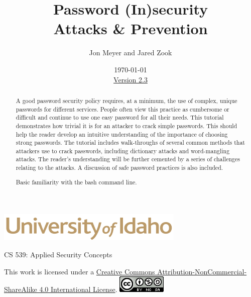 \documentclass[12pt]{extarticle}
\begin{document}
\title{ Password (In)security \\ \large Attacks \& Prevention}
\author{Jon Meyer and Jared Zook}
\date{\today \\ \hyperref[changelog]{Version 2.3} }
\renewcommand{\abstractname}{Summary}
\begin{titlepage}
\maketitle
{}
\begin{center}
\includegraphics[scale=.5]{UofI}

\large{CS 539: Applied Security Concepts}

\vskip 40pt

\end{center}

\begin{abstract}
A good password security policy requires, at a minimum, the use of complex, unique passwords for different services. People often view this practice as cumbersome or difficult and continue to use one easy password for all their needs. This tutorial demonstrates how trivial it is for an attacker to crack simple passwords. This should help the reader develop an intuitive understanding of the importance of choosing strong passwords. The tutorial includes walk-throughs of several common methods that attackers use to crack passwords, including dictionary attacks and word-mangling attacks. The reader's understanding will be further cemented by a series of challenges relating to the attacks. A discussion of safe password practices is also included.


Basic familiarity with the bash command line.
\end{abstract}


\vfill
\begin{center}
This work is licensed under a \href{https://creativecommons.org/licenses/by-nc-sa/4.0/legalcode}{Creative Commons Attribution-NonCommercial-ShareAlike 4.0 International License}.
\vskip 10pt
\includegraphics[scale=.5]{cc}
\end{center}

\end{titlepage}
\end{document}
